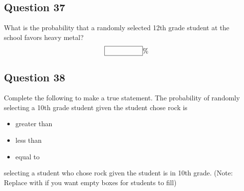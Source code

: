\documentclass[12pt]{article}
\begin{document}
\subsection*{Question 37}
What is the probability that a randomly selected 12th grade student at the school favors heavy metal?
\[ \framebox[2cm]{\phantom{Number}} \% \]

\subsection*{Question 38}
Complete the following to make a true statement.
The probability of randomly selecting a 10th grade student given the student chose rock is
\begin{itemize}
    \item [\XBox] greater than
    \item [\XBox] less than
    \item [\XBox] equal to
\end{itemize}
selecting a student who chose rock given the student is in 10th grade.
(Note: Replace \XBox with \Square if you want empty boxes for students to fill)

\end{document}
